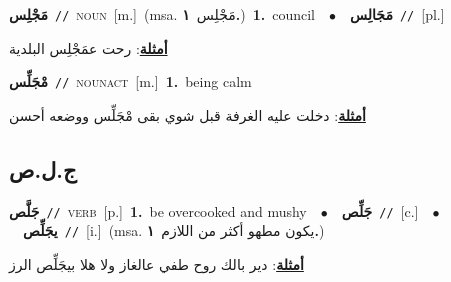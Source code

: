 \documentclass[10pt,a4paper,twoside]{article} %
\begin{document}
\begin{multicols}{2}
{\setlength\topsep{0pt}\textbf{\foreignlanguage{arabic}{مَجْلِس}}\ {\color{gray}\texttt{//}\color{black}}\ \textsc{noun}\ [m.]\ \color{gray}(msa. \foreignlanguage{arabic}{مَجْلِس}~\foreignlanguage{arabic}{\textbf{١.}})\color{black}\ \textbf{1.}~council\ \ $\bullet$\ \ \setlength\topsep{0pt}\textbf{\foreignlanguage{arabic}{مَجَالِس}}\ {\color{gray}\texttt{//}\color{black}}\ [pl.]\  \begin{flushright}\color{gray}\foreignlanguage{arabic}{\textbf{\underline{\foreignlanguage{arabic}{أمثلة}}}: رحت عمَجْلِس البلدية}\end{flushright}\color{black}} \vspace{2mm}

{\setlength\topsep{0pt}\textbf{\foreignlanguage{arabic}{مْجَلِّس}}\ {\color{gray}\texttt{//}\color{black}}\ \textsc{noun\textunderscore act}\ [m.]\ \textbf{1.}~being calm\  \begin{flushright}\color{gray}\foreignlanguage{arabic}{\textbf{\underline{\foreignlanguage{arabic}{أمثلة}}}: دخلت عليه الغرفة قبل شوي بقى مْجَلِّس ووضعه أحسن}\end{flushright}\color{black}} \vspace{2mm}

\vspace{-3mm}
\subsection*{\color{blue}\foreignlanguage{arabic}{ج.ل.ص}\color{blue}{}} 

{\setlength\topsep{0pt}\textbf{\foreignlanguage{arabic}{جَلَّص}}\ {\color{gray}\texttt{//}\color{black}}\ \textsc{verb}\ [p.]\ \textbf{1.}~be overcooked and mushy\ \ $\bullet$\ \ \setlength\topsep{0pt}\textbf{\foreignlanguage{arabic}{جَلِّص}}\ {\color{gray}\texttt{//}\color{black}}\ [c.]\ \ $\bullet$\ \ \setlength\topsep{0pt}\textbf{\foreignlanguage{arabic}{يجَلِّص}}\ {\color{gray}\texttt{//}\color{black}}\ [i.]\ \color{gray}(msa. \foreignlanguage{arabic}{يكون مطهو أكثر من اللازم}~\foreignlanguage{arabic}{\textbf{١.}})\color{black}\  \begin{flushright}\color{gray}\foreignlanguage{arabic}{\textbf{\underline{\foreignlanguage{arabic}{أمثلة}}}: دير بالك روح طفي عالغاز ولا هلا بيجَلِّص الرز}\end{flushright}\color{black}} \vspace{2mm}


\end{multicols}
\end{document}
